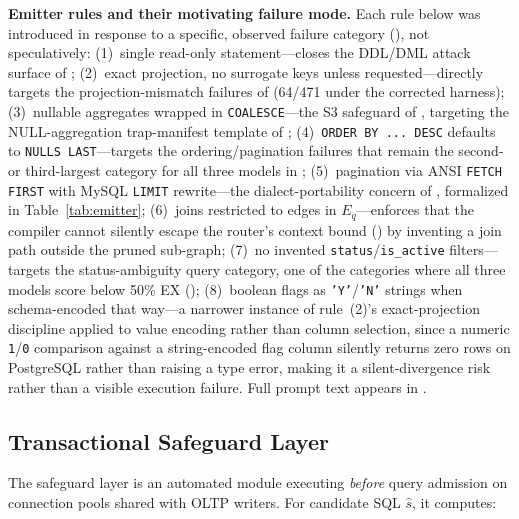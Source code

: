 \documentclass[twocolumn]{svjour3}
\begin{document}
\textbf{Emitter rules and their motivating failure mode.}
Each rule below was introduced in response to a specific, observed failure category (), not speculatively:
(1)~single read-only statement---closes the DDL/DML attack surface of ;
(2)~exact projection, no surrogate keys unless requested---directly targets the projection-mismatch failures of  (64/471 under the corrected harness);
(3)~nullable aggregates wrapped in \texttt{COALESCE}---the S3 safeguard of , targeting the NULL-aggregation trap-manifest template of ;
(4)~\texttt{ORDER BY ... DESC} defaults to \texttt{NULLS LAST}---targets the ordering/pagination failures that remain the second- or third-largest category for all three models in ;
(5)~pagination via ANSI \texttt{FETCH FIRST} with MySQL \texttt{LIMIT} rewrite---the dialect-portability concern of , formalized in Table~\ref{tab:emitter};
(6)~joins restricted to edges in $E_q$---enforces that the compiler cannot silently escape the router's context bound () by inventing a join path outside the pruned sub-graph;
(7)~no invented \texttt{status}/\texttt{is\_active} filters---targets the status-ambiguity query category, one of the categories where all three models score below 50\% EX ();
(8)~boolean flags as \texttt{'Y'}/\texttt{'N'} strings when schema-encoded that way---a narrower instance of rule~(2)'s exact-projection discipline applied to value encoding rather than column selection, since a numeric \texttt{1}/\texttt{0} comparison against a string-encoded flag column silently returns zero rows on PostgreSQL rather than raising a type error, making it a silent-divergence risk rather than a visible execution failure.
Full prompt text appears in .

\subsection{Transactional Safeguard Layer}
\label{sec:safeguard}

The safeguard layer is an automated module executing \emph{before} query admission on connection pools shared with OLTP writers.
For candidate SQL $\hat{s}$, it computes:
\end{document}

